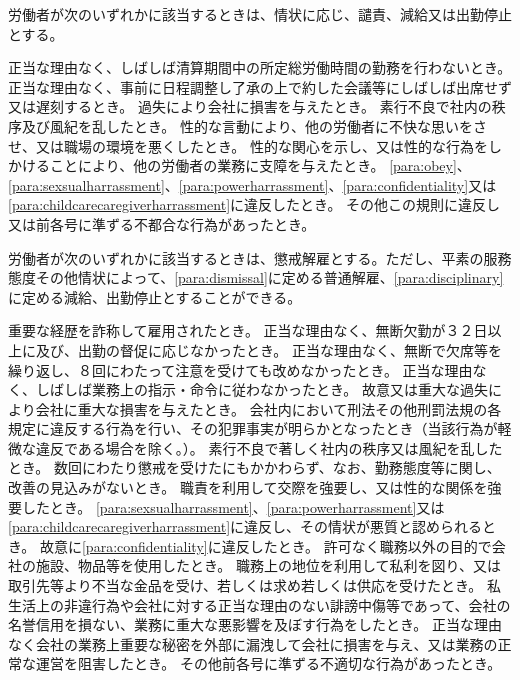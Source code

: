 \documentclass[10pt,a4paper,uplatex]{jsarticle}
\begin{document}
労働者が次のいずれかに該当するときは、情状に応じ、譴責、減給又は出勤停止とする。
\label{para:disciplinary}
\begin{enumerate}
    \itm 正当な理由なく、しばしば清算期間中の所定総労働時間の勤務を行わないとき。
    \itm 正当な理由なく、事前に日程調整し了承の上で約した会議等にしばしば出席せず又は遅刻するとき。
    \itm 過失により会社に損害を与えたとき。
    \itm 素行不良で社内の秩序及び風紀を乱したとき。
    \itm 性的な言動により、他の労働者に不快な思いをさせ、又は職場の環境を悪くしたとき。
    \itm 性的な関心を示し、又は性的な行為をしかけることにより、他の労働者の業務に支障を与えたとき。
    \itm \ref{para:obey}、\ref{para:sexsualharrassment}、\ref{para:powerharrassment}、\ref{para:confidentiality}又は\ref{para:childcarecaregiverharrassment}に違反したとき。
    \itm その他この規則に違反し又は前各号に準ずる不都合な行為があったとき。
\end{enumerate}
\term
労働者が次のいずれかに該当するときは、懲戒解雇とする。ただし、平素の服務態度その他情状によって、\ref{para:dismissal}に定める普通解雇、\ref{para:disciplinary}に定める減給、出勤停止とすることができる。
\begin{enumerate}
    \itm 重要な経歴を詐称して雇用されたとき。
    \itm 正当な理由なく、無断欠勤が３２日以上に及び、出勤の督促に応じなかったとき。
    \itm 正当な理由なく、無断で欠席等を繰り返し、８回にわたって注意を受けても改めなかったとき。
    \itm 正当な理由なく、しばしば業務上の指示・命令に従わなかったとき。
    \itm 故意又は重大な過失により会社に重大な損害を与えたとき。
    \itm 会社内において刑法その他刑罰法規の各規定に違反する行為を行い、その犯罪事実が明らかとなったとき（当該行為が軽微な違反である場合を除く。）。
    \itm 素行不良で著しく社内の秩序又は風紀を乱したとき。
    \itm 数回にわたり懲戒を受けたにもかかわらず、なお、勤務態度等に関し、改善の見込みがないとき。
    \itm 職責を利用して交際を強要し、又は性的な関係を強要したとき。
    \itm \ref{para:sexsualharrassment}、\ref{para:powerharrassment}又は\ref{para:childcarecaregiverharrassment}に違反し、その情状が悪質と認められるとき。
    \itm 故意に\ref{para:confidentiality}に違反したとき。
    \itm 許可なく職務以外の目的で会社の施設、物品等を使用したとき。
    \itm 職務上の地位を利用して私利を図り、又は取引先等より不当な金品を受け、若しくは求め若しくは供応を受けたとき。
    \itm 私生活上の非違行為や会社に対する正当な理由のない誹謗中傷等であって、会社の名誉信用を損ない、業務に重大な悪影響を及ぼす行為をしたとき。
    \itm 正当な理由なく会社の業務上重要な秘密を外部に漏洩して会社に損害を与え、又は業務の正常な運営を阻害したとき。
    \itm その他前各号に準ずる不適切な行為があったとき。
\end{enumerate}
\end{document}
